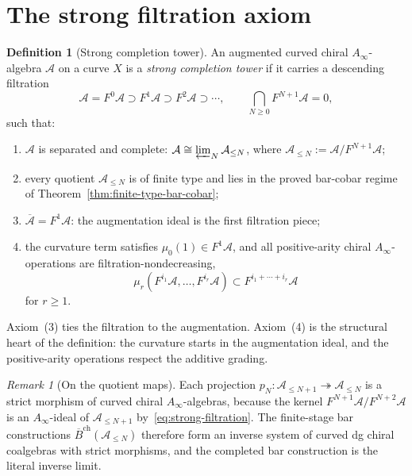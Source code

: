 \documentclass[11pt,reqno]{amsart}
\theoremstyle{definition}
\newtheorem{definition}[theorem]{Definition}
\theoremstyle{remark}
\newtheorem{remark}[theorem]{Remark}
\newcommand{\cA}{\mathcal{A}}
\newcommand{\barB}{\overline{B}}
\newcommand{\Ainf}{A_\infty}
\numberwithin{equation}{section}
\begin{document}

\section{The strong filtration axiom}
\label{sec:sf}

\begin{definition}[Strong completion tower]
\label{def:strong-tower}
An augmented curved chiral $\Ainf$-algebra $\cA$ on a curve
$X$ is a \emph{strong completion tower} if it carries a
descending filtration
\[
\cA = F^0\cA \supset F^1\cA \supset F^2\cA \supset \cdots,
\qquad
\bigcap_{N \ge 0} F^{N+1}\cA = 0,
\]
such that:
\begin{enumerate}
\item $\cA$ is separated and complete:
 $\cA \cong \varprojlim_N \cA_{\le N}$, where
 $\cA_{\le N} := \cA/F^{N+1}\cA$;
\item every quotient $\cA_{\le N}$ is of finite type and lies
 in the proved bar-cobar regime of
 Theorem~\ref{thm:finite-type-bar-cobar};
\item $\overline{\cA} = F^1\cA$: the augmentation ideal is
 the first filtration piece;
\item the curvature term satisfies $\mu_0(1)\in F^1\cA$, and all
	 positive-arity chiral $\Ainf$-operations are
	 filtration-nondecreasing,
	 \begin{equation}\label{eq:strong-filtration}
	 \mu_r(F^{i_1}\cA, \dots, F^{i_r}\cA) \subset
	 F^{i_1 + \cdots + i_r}\cA
	 \end{equation}
	 for $r\ge 1$.
\end{enumerate}
\end{definition}

Axiom~(3) ties the filtration to the augmentation. Axiom~(4)
is the structural heart of the definition: the curvature starts in
the augmentation ideal, and the positive-arity operations respect
the additive grading.

\begin{remark}[On the quotient maps]
Each projection $p_N\colon \cA_{\le N+1} \twoheadrightarrow
\cA_{\le N}$ is a strict morphism of curved chiral
$\Ainf$-algebras, because the kernel
$F^{N+1}\cA/F^{N+2}\cA$ is an $\Ainf$-ideal of
$\cA_{\le N+1}$ by~\eqref{eq:strong-filtration}. The
finite-stage bar constructions $\barB^{\mathrm{ch}}(\cA_{\le N})$
therefore form an inverse system of curved dg chiral
coalgebras with strict morphisms, and the completed bar
construction is the literal inverse limit.
\end{remark}
\end{document}

